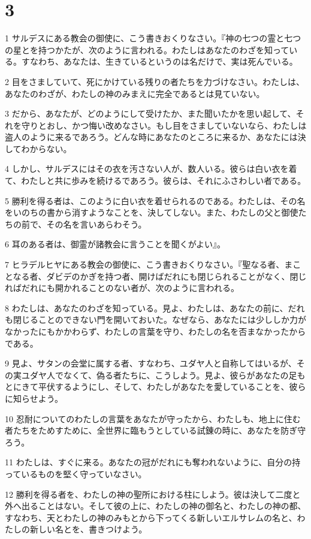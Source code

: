 \chapter{3}

\par 1 サルデスにある教会の御使に、こう書きおくりなさい。『神の七つの霊と七つの星とを持つかたが、次のように言われる。わたしはあなたのわざを知っている。すなわち、あなたは、生きているというのは名だけで、実は死んでいる。
\par 2 目をさましていて、死にかけている残りの者たちを力づけなさい。わたしは、あなたのわざが、わたしの神のみまえに完全であるとは見ていない。
\par 3 だから、あなたが、どのようにして受けたか、また聞いたかを思い起して、それを守りとおし、かつ悔い改めなさい。もし目をさましていないなら、わたしは盗人のように来るであろう。どんな時にあなたのところに来るか、あなたには決してわからない。
\par 4 しかし、サルデスにはその衣を汚さない人が、数人いる。彼らは白い衣を着て、わたしと共に歩みを続けるであろう。彼らは、それにふさわしい者である。
\par 5 勝利を得る者は、このように白い衣を着せられるのである。わたしは、その名をいのちの書から消すようなことを、決してしない。また、わたしの父と御使たちの前で、その名を言いあらわそう。
\par 6 耳のある者は、御霊が諸教会に言うことを聞くがよい』。
\par 7 ヒラデルヒヤにある教会の御使に、こう書きおくりなさい。『聖なる者、まことなる者、ダビデのかぎを持つ者、開けばだれにも閉じられることがなく、閉じればだれにも開かれることのない者が、次のように言われる。
\par 8 わたしは、あなたのわざを知っている。見よ、わたしは、あなたの前に、だれも閉じることのできない門を開いておいた。なぜなら、あなたには少ししか力がなかったにもかかわらず、わたしの言葉を守り、わたしの名を否まなかったからである。
\par 9 見よ、サタンの会堂に属する者、すなわち、ユダヤ人と自称してはいるが、その実ユダヤ人でなくて、偽る者たちに、こうしよう。見よ、彼らがあなたの足もとにきて平伏するようにし、そして、わたしがあなたを愛していることを、彼らに知らせよう。
\par 10 忍耐についてのわたしの言葉をあなたが守ったから、わたしも、地上に住む者たちをためすために、全世界に臨もうとしている試錬の時に、あなたを防ぎ守ろう。
\par 11 わたしは、すぐに来る。あなたの冠がだれにも奪われないように、自分の持っているものを堅く守っていなさい。
\par 12 勝利を得る者を、わたしの神の聖所における柱にしよう。彼は決して二度と外へ出ることはない。そして彼の上に、わたしの神の御名と、わたしの神の都、すなわち、天とわたしの神のみもとから下ってくる新しいエルサレムの名と、わたしの新しい名とを、書きつけよう。
